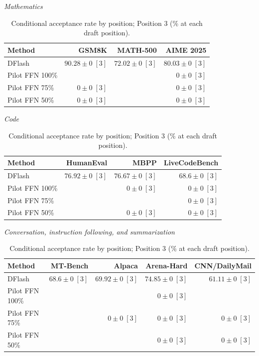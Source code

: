 \begin{table}[!htp]
\centering\small
\setlength{\tabcolsep}{3pt}
\caption{Conditional acceptance rate by position; Position 3 (\% at each draft position).}
\label{tab:appendix-metric-conditional-acceptance-3}
\textit{Mathematics}\par\smallskip
\begin{tabular}{@{}>{\raggedright\arraybackslash}p{3.7cm}rrr@{}}
\toprule
Method & GSM8K & MATH-500 & AIME 2025 \\
\midrule
DFlash & \(\mathbf{90.28} \pm 0\;[3]\) & \(72.02 \pm 0\;[3]\) & \(\mathbf{80.03} \pm 0\;[3]\) \\
Pilot FFN 100\% &  &  & \(0 \pm 0\;[3]\) \\
Pilot FFN 75\% & \(0 \pm 0\;[3]\) &  & \(0 \pm 0\;[3]\) \\
Pilot FFN 50\% & \(0 \pm 0\;[3]\) &  & \(0 \pm 0\;[3]\) \\
\bottomrule
\end{tabular}\par\medskip
\textit{Code}\par\smallskip
\begin{tabular}{@{}>{\raggedright\arraybackslash}p{3.7cm}rrr@{}}
\toprule
Method & HumanEval & MBPP & LiveCodeBench \\
\midrule
DFlash & \(76.92 \pm 0\;[3]\) & \(\mathbf{76.67} \pm 0\;[3]\) & \(\mathbf{68.6} \pm 0\;[3]\) \\
Pilot FFN 100\% &  & \(0 \pm 0\;[3]\) & \(0 \pm 0\;[3]\) \\
Pilot FFN 75\% &  &  & \(0 \pm 0\;[3]\) \\
Pilot FFN 50\% &  & \(0 \pm 0\;[3]\) & \(0 \pm 0\;[3]\) \\
\bottomrule
\end{tabular}\par\medskip
\textit{Conversation, instruction following, and summarization}\par\smallskip
\begin{tabular}{@{}>{\raggedright\arraybackslash}p{3.7cm}rrrr@{}}
\toprule
Method & MT-Bench & Alpaca & Arena-Hard & CNN/DailyMail \\
\midrule
DFlash & \(68.6 \pm 0\;[3]\) & \(\mathbf{69.92} \pm 0\;[3]\) & \(\mathbf{74.85} \pm 0\;[3]\) & \(\mathbf{61.11} \pm 0\;[3]\) \\
Pilot FFN 100\% &  &  & \(0 \pm 0\;[3]\) &  \\
Pilot FFN 75\% &  & \(0 \pm 0\;[3]\) & \(0 \pm 0\;[3]\) & \(0 \pm 0\;[3]\) \\
Pilot FFN 50\% &  &  & \(0 \pm 0\;[3]\) & \(0 \pm 0\;[3]\) \\

\end{tabular}
\end{table}
